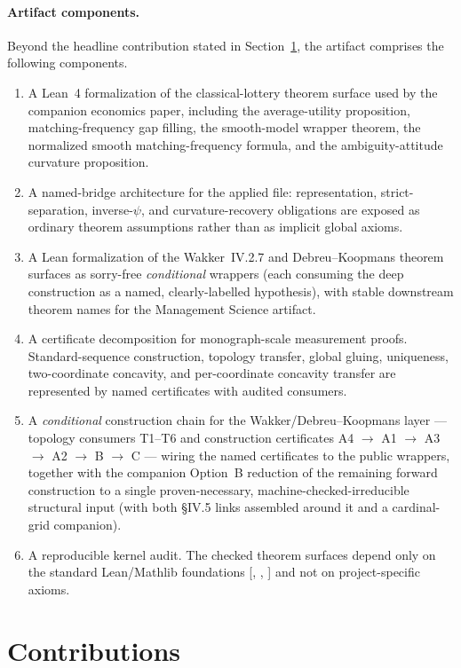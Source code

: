\documentclass[11pt,english]{article}
\newcommand{\code}[1]{\texttt{\detokenize{#1}}}
\newcommand{\foundations}{[\code{propext}, \code{Classical.choice}, \code{Quot.sound}]}
\begin{document}
\paragraph{Artifact components.}
Beyond the headline contribution stated in Section~\ref{sec:contributions}, the artifact comprises the following components.
\begin{enumerate}[leftmargin=*]
\item A Lean~4 formalization of the classical-lottery theorem surface used by the companion economics paper, including the average-utility proposition, matching-frequency gap filling, the smooth-model wrapper theorem, the normalized smooth matching-frequency formula, and the ambiguity-attitude curvature proposition.
\item A named-bridge architecture for the applied file: representation, strict-separation, inverse-\(\psi\), and curvature-recovery obligations are exposed as ordinary theorem assumptions rather than as implicit global axioms.
\item A Lean formalization of the Wakker~IV.2.7 and Debreu--Koopmans theorem surfaces as sorry-free \emph{conditional} wrappers (each consuming the deep construction as a named, clearly-labelled hypothesis), with stable downstream theorem names for the Management Science artifact.
\item A certificate decomposition for monograph-scale measurement proofs.  Standard-sequence construction, topology transfer, global gluing, uniqueness, two-coordinate concavity, and per-coordinate concavity transfer are represented by named certificates with audited consumers.
\item A \emph{conditional} construction chain for the Wakker/Debreu--Koopmans layer --- topology consumers T1--T6 and construction certificates A4 \(\to\) A1 \(\to\) A3 \(\to\) A2 \(\to\) B \(\to\) C --- wiring the named certificates to the public wrappers, together with the companion Option~B reduction of the remaining forward construction to a single proven-necessary, machine-checked-irreducible structural input (with both \S IV.5 links assembled around it and a cardinal-grid companion).
\item A reproducible kernel audit.  The checked theorem surfaces depend only on the standard Lean/Mathlib foundations \foundations{} and not on project-specific axioms.
\end{enumerate}

\section{Contributions}
\label{sec:contributions}
\end{document}
